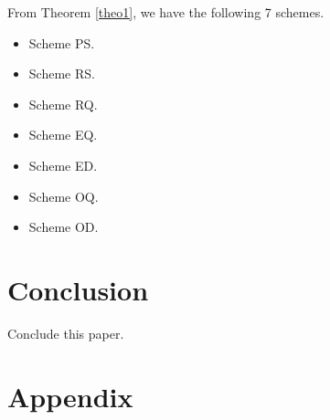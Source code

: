 \documentclass[a4paper,fleqn,11pt]{article}
\begin{document}
From Theorem \ref{theo1}, we have the following 7 schemes.
\begin{itemize}
	\item Scheme PS.
	\item Scheme RS.
	\item Scheme RQ.
	\item Scheme EQ.
	\item Scheme ED.
	\item Scheme OQ.
	\item Scheme OD.
\end{itemize}


\section{Conclusion}
	Conclude this paper.

\appendix
\section*{Appendix}	 %


%


	
\end{document}
